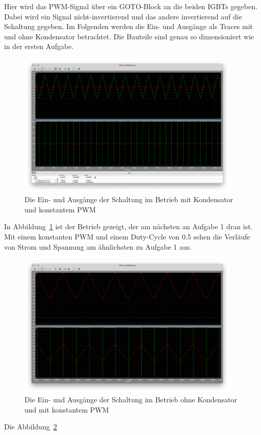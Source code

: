 \documentclass{report}
\begin{document}
Hier wird das PWM-Signal über ein GOTO-Block an die beiden IGBTs gegeben. Dabei wird ein Signal nicht-invertierend und das andere invertierend auf die Schaltung gegeben. Im Folgenden werden die Ein- und Ausgänge als Traces mit und ohne Kondensator betrachtet. Die Bauteile sind genau so dimensioniert wie in der ersten Aufgabe.

\begin{figure}
  \begin{center}
    \includegraphics[width=0.95\textwidth]{assets/img/aufg2_eingang_ausgang_c_wc.png}
  \end{center}
  \caption{Die Ein- und Ausgänge der Schaltung im Betrieb mit Kondensator und konstantem PWM}
  \label{fig:aufg2_eingang_ausgang_c_wc}
\end{figure}

In Abbildung~\ref{fig:aufg2_eingang_ausgang_c_wc} ist der Betrieb gezeigt, der am nächsten an Aufgabe 1 dran ist. Mit einem konstanten PWM und einem Duty-Cycle von 0.5 sehen die Verläufe von Strom und Spannung am ähnlichsten zu Aufgabe 1 aus. 

\begin{figure}
  \begin{center}
    \includegraphics[width=0.95\textwidth]{assets/img/aufg2_eingang_ausgang_c_nc.png}
  \end{center}
  \caption{Die Ein- und Ausgänge der Schaltung im Betrieb ohne Kondensator und mit konstantem PWM}
  \label{fig:aufg2_eingang_ausgang_c_nc}
\end{figure}

Die Abbildung~\ref{fig:aufg2_eingang_ausgang_c_nc} 
\end{document}
